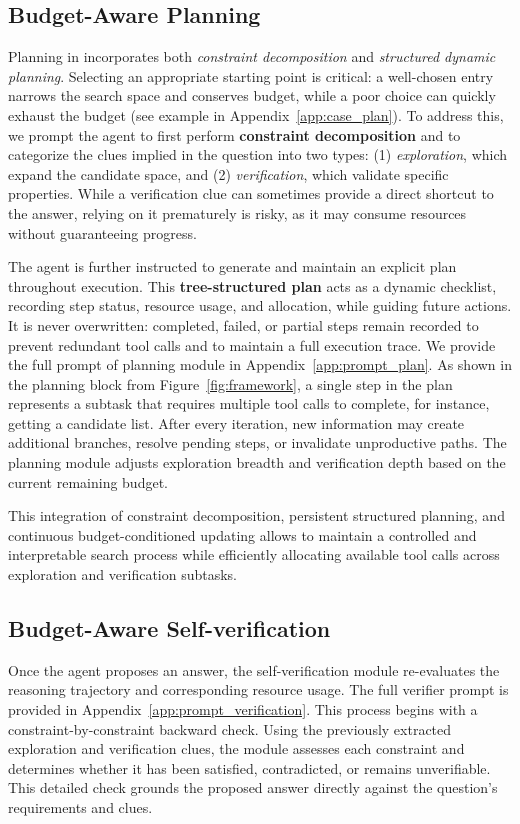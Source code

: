 \subsection{Budget-Aware Planning}

Planning in \method incorporates both \emph{constraint decomposition} and \emph{structured dynamic planning}. 
Selecting an appropriate starting point is critical: a well-chosen entry narrows the search space and conserves budget, while a poor choice can quickly exhaust the budget (see example in Appendix~\ref{app:case_plan}).
To address this, we prompt the agent to first perform \textbf{constraint decomposition} and to categorize the clues implied in the question into two types: (1) \emph{exploration}, which expand the candidate space, and (2) \emph{verification}, which validate specific properties. While a verification clue can sometimes provide a direct shortcut to the answer, relying on it prematurely is risky, as it may consume resources without guaranteeing progress. 

The agent is further instructed to generate and maintain an explicit plan throughout execution. This \textbf{tree-structured plan} acts as a dynamic checklist, recording step status, resource usage, and allocation, while guiding future actions. It is never overwritten: completed, failed, or partial steps remain recorded to prevent redundant tool calls and to maintain a full execution trace. We provide the full prompt of planning module in Appendix~\ref{app:prompt_plan}.
As shown in the planning block from  Figure~\ref{fig:framework}, a single step in the plan represents a subtask that requires multiple tool calls to complete, for instance, getting a candidate list. 
After every iteration, new information may create additional branches, resolve pending steps, or invalidate unproductive paths. The planning module adjusts exploration breadth and verification depth based on the current remaining budget. 

This integration of constraint decomposition, persistent structured planning, and continuous budget-conditioned updating allows \method to maintain a controlled and interpretable search process while efficiently allocating available tool calls across exploration and verification subtasks. 




\subsection{Budget-Aware Self-verification}
Once the agent proposes an answer, the self-verification module re-evaluates the reasoning trajectory and corresponding resource usage. The full verifier prompt is provided in Appendix~\ref{app:prompt_verification}. This process begins with a constraint-by-constraint backward check. Using the previously extracted exploration and verification clues, the module assesses each constraint and determines whether it has been satisfied, contradicted, or remains unverifiable. This detailed check grounds the proposed answer directly against the question's requirements and clues. 


